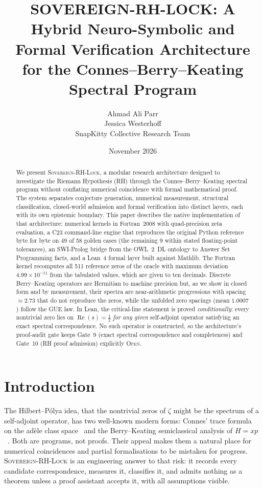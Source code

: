 \documentclass[11pt,letterpaper]{article}
\title{\textbf{SOVEREIGN-RH-LOCK: A Hybrid Neuro-Symbolic and Formal Verification Architecture for the Connes--Berry--Keating Spectral Program}}
\author{Ahmad Ali Parr\\ Jessica Westerhoff\\ SnapKitty Collective Research Team}
\date{November 2026}
\begin{document}
\maketitle

\begin{abstract}
We present \textsc{Sovereign-RH-Lock}, a modular research architecture designed to investigate the Riemann Hypothesis (RH) through the Connes--Berry--Keating spectral program without conflating numerical coincidence with formal mathematical proof. The system separates conjecture generation, numerical measurement, structural classification, closed-world admission and formal verification into distinct layers, each with its own epistemic boundary. This paper describes the native implementation of that architecture: numerical kernels in Fortran~2008 with quad-precision zeta evaluation, a C23 command-line engine that reproduces the original Python reference byte for byte on 49 of 58 golden cases (the remaining 9 within stated floating-point tolerances), an SWI-Prolog bridge from the OWL~2~DL ontology to Answer Set Programming facts, and a Lean~4 formal layer built against Mathlib. The Fortran kernel recomputes all 511 reference zeros of the oracle with maximum deviation $4.99\times10^{-11}$ from the tabulated values, which are given to ten decimals. Discrete Berry--Keating operators are Hermitian to machine precision but, as we show in closed form and by measurement, their spectra are near-arithmetic progressions with spacing $\approx 2.73$ that do not reproduce the zeros, while the unfolded zero spacings (mean $1.0007$) follow the GUE law. In Lean, the critical-line statement is proved \emph{conditionally}: every nontrivial zero lies on $\operatorname{Re}(s)=\frac12$ \emph{for any given} self-adjoint operator satisfying an exact spectral correspondence. No such operator is constructed, so the architecture's proof-audit gate keeps Gate~9 (exact spectral correspondence and completeness) and Gate~10 (RH proof admission) explicitly \textsc{Open}.
\end{abstract}

\tableofcontents

\section{Introduction}

The Hilbert--P\'olya idea, that the nontrivial zeros of $\zeta$ might be the spectrum of a self-adjoint operator, has two well-known modern forms: Connes' trace formula on the ad\`ele class space~\cite{connes1999} and the Berry--Keating semiclassical analysis of $H=xp$~\cite{berry1999}. Both are programs, not proofs. Their appeal makes them a natural place for numerical coincidences and partial formalisations to be mistaken for progress. \textsc{Sovereign-RH-Lock} is an engineering answer to that risk: it records every candidate correspondence, measures it, classifies it, and admits nothing as a theorem unless a proof assistant accepts it, with all assumptions visible.
\end{document}

